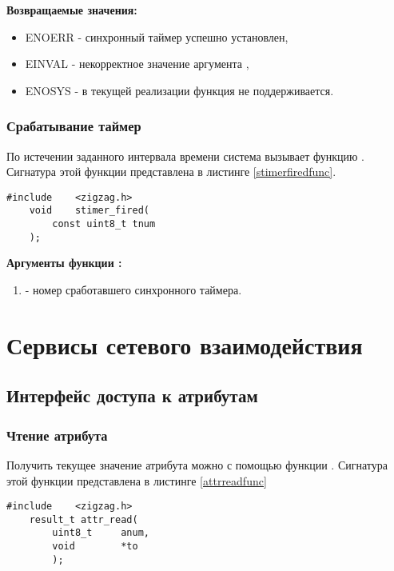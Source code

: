{\bfseries Возвращаемые значения:}

{\itshape
\begin{itemize}
\item ENOERR - синхронный таймер успешно установлен,
\item EINVAL - некорректное значение аргумента ,
\item ENOSYS - в текущей реализации функция не поддерживается.
\end{itemize}
}

\subsubsection{ Срабатывание таймер }
    По истечении заданного интервала времени система \zigzag вызывает функцию .
Сигнатура этой функции представлена в листинге \ref{stimerfiredfunc}.

\begin{lstlisting}[caption=Функция \myfunc{stimer\_fired()} - срабатывание синхр. таймера. , label=stimerfiredfunc]
    #include    <zigzag.h>
    void    stimer_fired( 
        const uint8_t tnum 
    );
\end{lstlisting}
{\bfseries Аргументы функции :}

{\itshape
\begin{enumerate} 
\item {} - номер сработавшего синхронного таймера.
\end{enumerate}
}

\section{Сервисы сетевого взаимодействия}

\subsection{Интерфейс доступа к атрибутам}

\subsubsection{Чтение атрибута}

Получить текущее значение атрибута можно с помощью функции .
Сигнатура этой функции представлена в листинге \ref{attrreadfunc}

\begin{lstlisting}[caption=Функция \myfunc{attr\_read()} - чтение атрибута. , label=attrreadfunc]
    #include    <zigzag.h>
    result_t attr_read(
        uint8_t     anum,
        void        *to
        );
\end{lstlisting}

